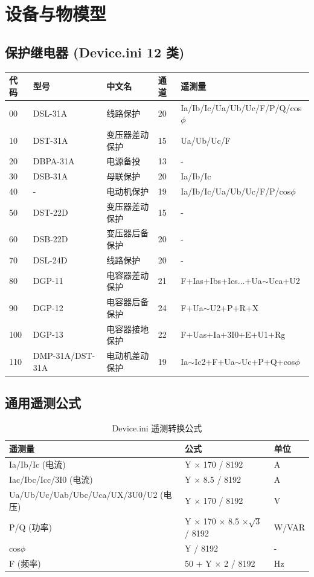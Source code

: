 \documentclass[12pt,a4paper]{ctexart}
\begin{document}
\section{设备与物模型}

\subsection{保护继电器 (Device.ini 12 类)}

\begin{longtable}{p{1cm}p{3.5cm}p{3.5cm}p{2cm}p{4cm}}
\toprule
\textbf{代码} & \textbf{型号} & \textbf{中文名} & \textbf{通道} & \textbf{遥测量} \\
\midrule
00 & DSL-31A & 线路保护 & 20 & Ia/Ib/Ic/Ua/Ub/Uc/F/P/Q/cos$\phi$ \\
10 & DST-31A & 变压器差动保护 & 15 & Ua/Ub/Uc/F \\
20 & DBPA-31A & 电源备投 & 13 & - \\
30 & DSB-31A & 母联保护 & 20 & Ia/Ib/Ic \\
40 & - & 电动机保护 & 19 & Ia/Ib/Ic/Ua/Ub/Uc/F/P/cos$\phi$ \\
50 & DST-22D & 变压器差动保护 & 15 & - \\
60 & DSB-22D & 变压器后备保护 & 20 & - \\
70 & DSL-24D & 线路保护 & 20 & - \\
80 & DGP-11 & 电容器差动保护 & 21 & F+Ias+Ibs+Ics...+Ua$\sim$Uca+U2 \\
90 & DGP-12 & 电容器后备保护 & 24 & F+Ua$\sim$U2+P+R+X \\
100 & DGP-13 & 电容器接地保护 & 22 & F+Uas+Ia+3I0+E+U1+Rg \\
110 & DMP-31A/DST-31A & 电动机差动保护 & 19 & Ia$\sim$Ic2+F+Ua$\sim$Uc+P+Q+cos$\phi$ \\
\bottomrule
\end{longtable}

\subsection{通用遥测公式}

\begin{table}[H]\centering
\caption{Device.ini 遥测转换公式}
\begin{tabular}{p{4cm}p{8cm}p{2cm}}
\toprule
\textbf{遥测量} & \textbf{公式} & \textbf{单位} \\
\midrule
Ia/Ib/Ic (电流) & Y $\times$ 170 / 8192 & A \\
Iac/Ibc/Icc/3I0 (电流) & Y $\times$ 8.5 / 8192 & A \\
Ua/Ub/Uc/Uab/Ubc/Uca/UX/3U0/U2 (电压) & Y $\times$ 170 / 8192 & V \\
P/Q (功率) & Y $\times$ 170 $\times$ 8.5 $\times \sqrt{3}$ / 8192 & W/VAR \\
cos$\phi$ & Y / 8192 & - \\
F (频率) & 50 + Y $\times$ 2 / 8192 & Hz \\
\bottomrule
\end{tabular}
\end{table}
\end{document}
